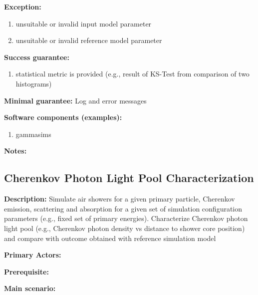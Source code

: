 \textbf{Exception:}
\begin{enumerate}
    \item unsuitable or invalid input model parameter
    \item unsuitable or invalid reference model parameter
\end{enumerate}

\textbf{Success guarantee:}
\begin{enumerate}
    \item statistical metric is provided (e.g., result of KS-Test from comparison of two histograms)
\end{enumerate}

\textbf{Minimal guarantee:}
Log and error messages

\textbf{Software components (examples):}
\begin{enumerate}
    \item gammasims
\end{enumerate}

\textbf{Notes:}


\subsection{Cherenkov Photon Light Pool Characterization}
\label{validation:CherenkovPhotonLightPoolCharacterization}
\textbf{Description:}
Simulate air showers for a given primary particle, Cherenkov emission, scattering and absorption for a given set of simulation configuration parameters (e.g., fixed set of primary energies).
Characterize Cherenkov photon light pool (e.g., Cherenkov photon density vs distance to shower core position) and compare with outcome obtained with reference simulation model

\textbf{Primary Actors:}

\textbf{Prerequisite:}

\textbf{Main scenario:}

